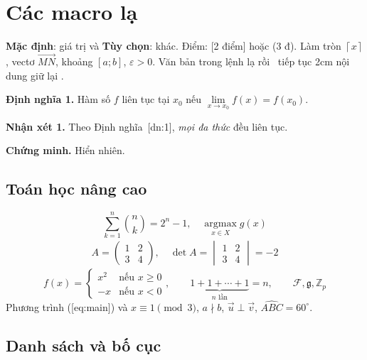\documentclass[11pt]{article}
\theoremstyle{definition}
\begin{document}
 
\section{Các macro lạ}
\textbf{Mặc định}: giá trị và \textbf{Tùy chọn}: khác. Điểm: [2 điểm] hoặc (3 đ).
Làm tròn $\left\lceil x \right\rceil$, vectơ $\overrightarrow{MN}$, khoảng $\left[a;b\right]$, $\varepsilon>0$.
 Văn bản trong lệnh lạ  rồi  \ tiếp tục  2cm nội dung giữ lại .



\textbf{Định nghĩa 1.} 
Hàm số $f$ liên tục tại $x_0$ nếu $\lim\limits_{x\to x_0} f(x)=f(x_0)$.





\textbf{Nhận xét 1.} 
Theo Định nghĩa~[dn:1], \textit{mọi đa thức} đều liên tục.





\textbf{Chứng minh.} 
Hiển nhiên.




\subsection{Toán học nâng cao}
\begin{equation}\label{eq:main}
\sum_{k=1}^{n} \binom{n}{k} = 2^n - 1, \quad \operatorname*{argmax}_{x\in X} g(x)
\end{equation}
\begin{gather*}
A = \begin{pmatrix} 1 & 2 \\ 3 & 4 \end{pmatrix}, \quad \det A = \begin{vmatrix} 1 & 2\\ 3 & 4\end{vmatrix} = -2
\end{gather*}
\[
f(x)=\begin{cases} x^2 & \text{nếu } x\ge 0\\ -x & \text{nếu } x<0 \end{cases}, \qquad
\underbrace{1+1+\cdots+1}_{n \text{ lần}} = n, \qquad \mathcal{F}, \mathfrak{g}, \mathbb{Z}_p
\]
Phương trình ([eq:main]) và $x \equiv 1 \pmod 3$, $a \nmid b$, $\vec{u}\perp\vec{v}$, $\widehat{ABC}=60^\circ$.

\subsection{Danh sách và bố cục}
\end{document}
